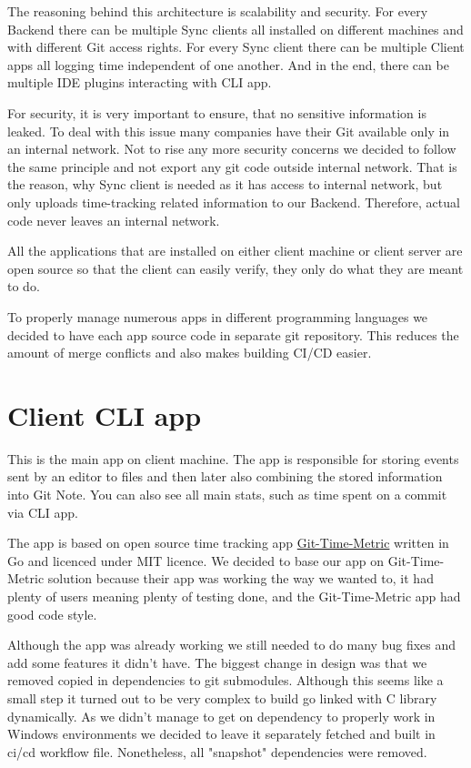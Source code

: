 The reasoning behind this architecture is scalability and security.
For every Backend there can be multiple Sync clients all installed on different machines and with different Git access rights.
For every Sync client there can be multiple Client apps all logging time independent of one another.
And in the end, there can be multiple IDE plugins interacting with CLI app.

For security, it is very important to ensure, that no sensitive information is leaked.
To deal with this issue many companies have their Git available only in an internal network.
Not to rise any more security concerns we decided to follow the same principle and not export any git code outside internal network.
That is the reason, why Sync client is needed as it has access to internal network, but only uploads time-tracking related information to our Backend.
Therefore, actual code never leaves an internal network.

All the applications that are installed on either client machine or client server are open source so that the client can easily verify,
they only do what they are meant to do.

To properly manage numerous apps in different programming languages we decided to have each app source code in separate git repository.
This reduces the amount of merge conflicts and also makes building CI/CD easier.

\section{Client CLI app}\label{sec:cli-app}
This is the main app on client machine.
The app is responsible for storing events sent by an editor to files and then later also combining the stored information into Git Note.
You can also see all main stats, such as time spent on a commit via CLI app.

The app is based on open source time tracking app \href{https://github.com/git-time-metric/gtm}{Git-Time-Metric} written in Go and licenced under MIT licence.
We decided to base our app on Git-Time-Metric solution because their app was working the way we wanted to, it had plenty of users meaning plenty of testing done,
and the Git-Time-Metric app had good code style.

Although the app was already working we still needed to do many bug fixes and add some features it didn't have.
The biggest change in design was that we removed copied in dependencies to git submodules.
Although this seems like a small step it turned out to be very complex to build go linked with C library dynamically.
As we didn't manage to get on dependency to properly work in Windows environments we decided to leave it separately fetched and built in ci/cd workflow file.
Nonetheless, all "snapshot" dependencies were removed.

